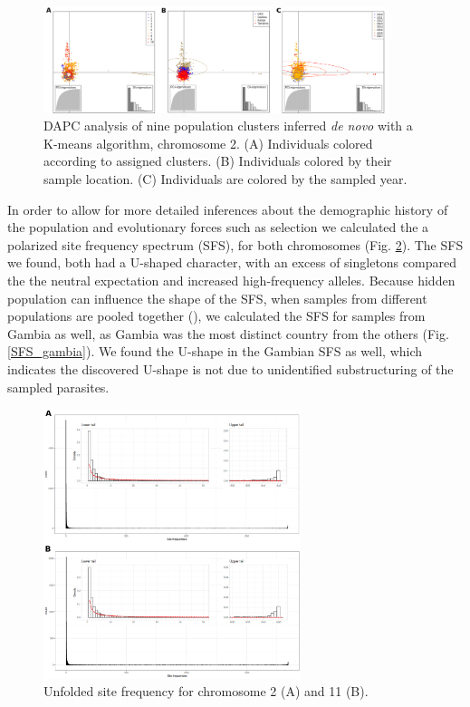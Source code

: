 \documentclass[11pt]{article}
\begin{document}
\begin{figure}[htbp]
\centering
\includegraphics[width=0.9\textwidth]{./figures/dapc_Kmeans_chr11.png}
\caption{\label{dapc_corr_chr11}DAPC analysis of nine population clusters inferred \emph{de novo} with a K-means algorithm, chromosome 2. (A) Individuals colored according to assigned clusters. (B) Individuals colored by their sample location. (C) Individuals are colored by the sampled year.}
\end{figure}

In order to allow for more detailed inferences about the demographic history of the population and evolutionary forces such as selection we calculated the a polarized site frequency spectrum (SFS), for both chromosomes (Fig. \ref{SFS_unfolded}). The SFS we found, both had a U-shaped character, with an excess of singletons compared the the neutral expectation and increased high-frequency alleles. Because hidden population can influence the shape of the SFS, when samples from different populations are pooled together (\cite{lapierre-2016-impac-selec}), we calculated the SFS for samples from Gambia as well, as Gambia was the most distinct country from the others (Fig. \ref{SFS_gambia}). We found the U-shape in the Gambian SFS as well, which indicates the discovered U-shape is not due to unidentified substructuring of the sampled parasites.

\begin{figure}[htbp]
\centering
\includegraphics[width=0.67\textwidth]{./figures/sfs_unfolded_scaled.png}
\caption{\label{SFS_unfolded}Unfolded site frequency for chromosome 2 (A) and 11 (B).}
\end{figure}
\end{document}
